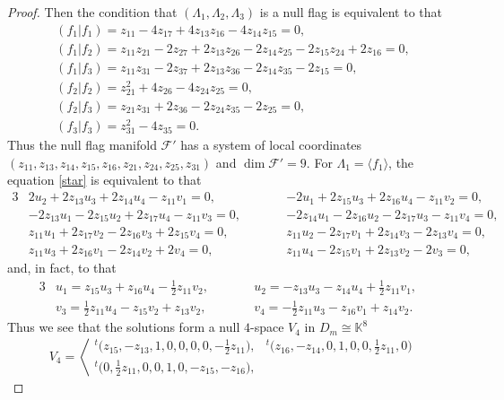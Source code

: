 \documentclass[pdftex]{sigma}
\numberwithin{equation}{section}
\theoremstyle{definition}
\newcommand{\KK}{\mathbb{K}}
\newcommand{\0}{\boldsymbol{0}}
\begin{document}
\begin{proof}
Then the condition that $(\Lambda_1, \Lambda_2, \Lambda_3)$ is a null flag is equivalent to that
\begin{gather*}
(f_1 \vert f_1) = z_{11} - 4z_{17} + 4z_{13}z_{16} - 4z_{14}z_{15} = 0,
\\
(f_1 \vert f_2) = z_{11}z_{21} - 2z_{27} + 2z_{13}z_{26} - 2z_{14}z_{25} - 2z_{15}z_{24} + 2z_{16} = 0,
\\
(f_1 \vert f_3) = z_{11}z_{31} - 2z_{37} + 2z_{13}z_{36} - 2z_{14}z_{35} - 2z_{15} = 0,
\\
(f_2 \vert f_2) = z_{21}^2 + 4z_{26} - 4z_{24}z_{25} = 0,
\\
(f_2 \vert f_3) = z_{21}z_{31} + 2z_{36} - 2z_{24}z_{35} - 2z_{25} = 0,
\\
(f_3 \vert f_3) = z_{31}^2 - 4z_{35} = 0.
\end{gather*}
Thus the null flag manifold ${\mathcal F}'$ has a system of local coordinates $(z_{11}, z_{13}, z_{14}, z_{15}, z_{16}, z_{21}, z_{24},\allowbreak z_{25}, z_{31})$ and $\dim {\mathcal F}' = 9$.
For $\Lambda_1 = \langle f_1\rangle$, the equation \eqref{star} is equivalent to that
\begin{alignat*}{3}
&2u_2 + 2z_{13}u_3 + 2z_{14}u_4 - z_{11}v_1 = 0,
\qquad&&
-2u_1 + 2z_{15}u_3 + 2z_{16}u_4 - z_{11}v_2 = 0,&
\\
&-2z_{13}u_1 - 2z_{15}u_2 + 2z_{17}u_4 - z_{11}v_3 = 0,
\qquad&&
-2z_{14}u_1 - 2z_{16}u_2 - 2z_{17}u_3 - z_{11}v_4 = 0,&
\\
&z_{11}u_1 + 2z_{17}v_2 - 2z_{16}v_3 + 2z_{15}v_4 = 0,
\qquad&&
z_{11}u_2 - 2z_{17}v_1 + 2z_{14}v_3 - 2z_{13}v_4 = 0,&
\\
&z_{11}u_3 + 2z_{16}v_1 - 2z_{14}v_2 + 2v_4 = 0,
\qquad&&
z_{11}u_4 - 2z_{15}v_1 + 2z_{13}v_2 - 2v_3 = 0,&
\end{alignat*}
and, in fact, to that
\begin{alignat*}{3}
&u_1 = z_{15}u_3 + z_{16}u_4 - \frac{1}{2}z_{11}v_2, \qquad&&
u_2 = -z_{13}u_3 - z_{14}u_4 + \frac{1}{2}z_{11}v_1,&
\\
&v_3 = \frac{1}{2}z_{11}u_4 - z_{15}v_2 + z_{13}v_2, \qquad&&
v_4 = - \frac{1}{2}z_{11}u_3 - z_{16}v_1 + z_{14}v_2.&
\end{alignat*}
Thus we see that the solutions form a null $4$-space $V_4$ in $D_m \cong \KK^8$
\[
V_4 = \left\langle
\begin{matrix}
{}^t\bigl(z_{15}, - z_{13}, 1, 0, 0, 0, 0, - \frac{1}{2}z_{11}\bigr), &
{}^t\bigl(z_{16}, - z_{14}, 0, 1, 0, 0, \frac{1}{2}z_{11}, 0\bigr)
\\
{}^t\bigl(0, \frac{1}{2}z_{11}, 0, 0, 1, 0, - z_{15}, - z_{16}\bigr), &

\end{matrix}\]
\end{proof}
\end{document}
